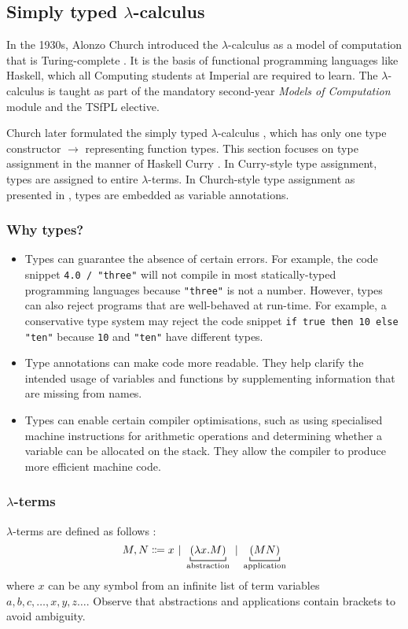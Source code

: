 \subsection{Simply typed \texorpdfstring{$\lambda$-calculus}{Lambda Calculus}}
In the 1930s, Alonzo Church introduced the $\lambda$-calculus \cite{church:1936} as a model of computation that is Turing-complete \cite{turing:1937}. It is the basis of functional programming languages like Haskell, which all Computing students at Imperial are required to learn. The $\lambda$-calculus is taught as part of the mandatory second-year \textit{Models of Computation} module and the TSfPL elective.

Church later formulated the simply typed $\lambda$-calculus \cite{church:1940}, which has only one type constructor $\to$ representing function types. This section focuses on type assignment in the manner of Haskell Curry \cite{curry:1934}. In Curry-style type assignment, types are assigned to entire $\lambda$-terms. In Church-style type assignment as presented in \cite{church:1940}, types are embedded as variable annotations.

\subsubsection{Why types?}
\begin{itemize}
    \item Types can guarantee the absence of certain errors. For example, the code snippet \lstinline{4.0 / "three"} will not compile in most statically-typed programming languages because \lstinline{"three"} is not a number. However, types can also reject programs that are well-behaved at run-time. For example, a conservative type system may reject the code snippet \lstinline{if true then 10 else "ten"} because \lstinline{10} and \lstinline{"ten"} have different types.
    \item Type annotations can make code more readable. They help clarify the intended usage of variables and functions by supplementing information that are missing from names.
    \item Types can enable certain compiler optimisations, such as using specialised machine instructions for arithmetic operations and determining whether a variable can be allocated on the stack. They allow the compiler to produce more efficient machine code.
\end{itemize}

\subsubsection{\texorpdfstring{$\lambda$}{Lambda}-terms}
\label{lambda:lambda-terms}
$\lambda$-terms are defined as follows \cite{church:1941}:
\[
    M,N \Coloneqq x \alt \underbracket[0.6pt]{(\lambda x. M)}_\text{abstraction} \alt \underbracket[0.6pt]{(MN)}_\text{application}
\]
where $x$ can be any symbol from an infinite list of term variables $a, b, c, \ldots, x, y, z \ldots$. Observe that abstractions and applications contain brackets to avoid ambiguity.

